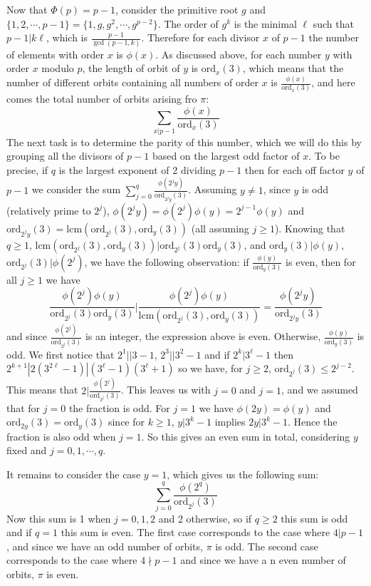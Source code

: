 \documentclass[11pt,a4paper]{article}
\newcommand{\<}{\langle}
\renewcommand{\>}{\rangle}
\newcommand{\ord}{\mathrm{ord}}
\newcommand{\lcm}{\mathrm{lcm}}
\begin{document}
\begin{enumerate}
	Now that $\Phi(p)=p-1$, consider the primitive root $g$ and $\{1, 2, \cdots , p-1\}=\{1, g, g^2, \cdots , g^{p-2}\}$. The order of $g^k$ is the minimal $\ell$ such that $p-1|k\ell$, which is $\frac{p-1}{\gcd(p-1, k)}$. Therefore for each divisor $x$ of $p-1$ the number of elements with order $x$ is $\phi(x)$. As discussed above, for each number $y$ with order $x$ modulo $p$, the length of orbit of $y$ is $\ord_x(3)$, which means that the number of different orbits containing all numbers of order $x$ is $\frac{\phi(x)}{\ord_x(3)}$, and here comes the total number of orbits arising fro $\pi$: 
	\[\sum_{x|p-1} \frac{\phi(x)}{\ord_x(3)}\]
	The next task is to determine the parity of this number, which we will do this by grouping all the divisors of $p-1$ based on the largest odd factor of $x$. To be precise, if $q$ is the largest exponent of 2 dividing $p-1$ then for each off factor $y$ of $p-1$ we consider the sum $\sum_{j=0}^q \frac{\phi(2^j y)}{\ord_{2^j y}(3)}$. Assuming $y\neq 1$, since $y$ is odd (relatively prime to $2^j$), $\phi(2^j y)=\phi(2^j)\phi(y)=2^{j-1}\phi(y)$ and $\ord_{2^j y}(3)=\lcm(\ord_{2^j}(3), \ord_{y}(3))$ (all assuming $j\ge 1$). Knowing that $q\ge 1$, $\lcm(\ord_{2^j}(3), \ord_{y}(3))|\ord_{2^j}(3)\ord_{y}(3)$, and $\ord_{y}(3)|\phi(y)$, $\ord_{2^j}(3)|\phi(2^j)$, we have the following observation: if $\frac{\phi(y)}{\ord_{y}(3)}$ is even, then for all $j\ge 1$ we have  
	\[\frac{\phi(2^j)\phi(y)}{\ord_{2^j}(3)\ord_{y}(3)}|\frac{\phi(2^j)\phi(y)}{\lcm(\ord_{2^j}(3), \ord_{y}(3))}=\frac{\phi(2^j y)}{\ord_{2^j y}(3)}\]
	and since $\frac{\phi(2^j)}{\ord_{2^j}(3)}$ is an integer, the expression above is even. Otherwise, $\frac{\phi(y)}{\ord_{y}(3)}$ is odd. We first notice that $2^1||3-1$, $2^3||3^2-1$ and if $2^k|3^{\ell}-1$ then $2^{k+1}|2(3^{2\ell}-1)|(3^{\ell}-1)(3^{\ell}+1)$ so we have, for $j\ge 2$, $\ord_{2^j} (3)\le 2^{j-2}$. This means that $2|\frac{\phi(2^j)}{\ord_{2^j} (3)}$. This leaves us with $j=0$ and $j=1$, and we assumed that for $j=0$ the fraction is odd. For $j=1$ we have $\phi(2y)=\phi(y)$ and $\ord_{2y}(3)=\ord_{y}(3)$ since for $k\ge 1$, $y|3^k-1$ implies $2y|3^k-1$. Hence the fraction is also odd when $j=1$. So this gives an even sum in total, considering $y$ fixed and $j=0, 1, \cdots , q$. 
	
	It remains to consider the case $y=1$, which gives us the following sum: 
	\[\sum_{j=0}^{q}\frac{\phi(2^q)}{\ord_{2^j}(3)}\]
	Now this sum is 1 when $j=0, 1, 2$ and 2 otherwise, so if $q\ge 2$ this sum is odd and if $q=1$ this sum is even. The first case corresponds to the case where $4|p-1$, and since we have an odd number of orbits, $\pi$ is odd. The second case corresponds to the case where $4\nmid p-1$ and since we have a n even number of orbits, $\pi$ is even. 
\end{enumerate}
\end{document}
